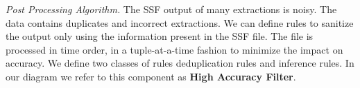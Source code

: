 \textit{Post Processing Algorithm.}
The SSF output of many extractions is noisy. The data contains duplicates and incorrect extractions. We can define rules to sanitize the output only using the information present in the SSF file. The file is processed in time order, in a tuple-at-a-time fashion to minimize the impact on accuracy. We define two classes of rules deduplication rules and inference rules. In our diagram we refer to this component as \textbf{High Accuracy Filter}.
